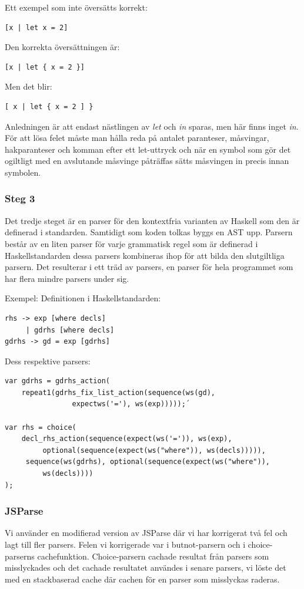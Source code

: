 Ett exempel som inte översätts korrekt:
\begin{lstlisting}
[x | let x = 2]
\end{lstlisting}
Den korrekta översättningen är:
\begin{lstlisting}
[x | let { x = 2 }]
\end{lstlisting}
Men det blir:
\begin{lstlisting}
[ x | let { x = 2 ] }
\end{lstlisting}
Anledningen är att endast nästlingen av \emph{let} och \emph{in} sparas, men här finns inget \emph{in}.
För att lösa felet måste man hålla reda på antalet paranteser, måsvingar, hakparanteser och komman efter ett let-uttryck och när en symbol som gör det ogiltligt 
med en avslutande måsvinge påträffas sätts måsvingen in precis innan symbolen.

\subsubsection{Steg 3}
Det tredje steget är en parser för den kontextfria varianten av Haskell som den är definerad i standarden. 
Samtidigt som koden tolkas byggs en AST upp. Parsern består av en liten parser för varje grammatisk regel som är definerad i Haskellstandarden 
dessa parsers kombineras ihop för att bilda den slutgiltliga parsern. Det resulterar i ett träd av parsers, en parser för hela programmet som har flera mindre parsers under sig.

Exempel:
Definitionen i Haskellstandarden:
\begin{lstlisting}
rhs -> exp [where decls]
     | gdrhs [where decls]
gdrhs -> gd = exp [gdrhs]
\end{lstlisting}
Dess respektive parsers:
\begin{lstlisting}
var gdrhs = gdrhs_action(
    repeat1(gdrhs_fix_list_action(sequence(ws(gd), 
                expectws('='), ws(exp)))));´

var rhs = choice(
    decl_rhs_action(sequence(expect(ws('=')), ws(exp), 
         optional(sequence(expect(ws("where")), ws(decls))))),
     sequence(ws(gdrhs), optional(sequence(expect(ws("where")), 
         ws(decls))))
);
\end{lstlisting}

\subsubsection{JSParse}
Vi använder en modifierad version av JSParse där vi har korrigerat två fel och lagt till fler parsers. Felen vi korrigerade var i butnot-parsern och i choice-parserns cachefunktion. 
Choice-parsern cachade resultat från parsers som misslyckades och det cachade resultatet användes i senare parsers, 
vi löste det med en stackbaserad cache där cachen för en parser som misslyckas raderas.


